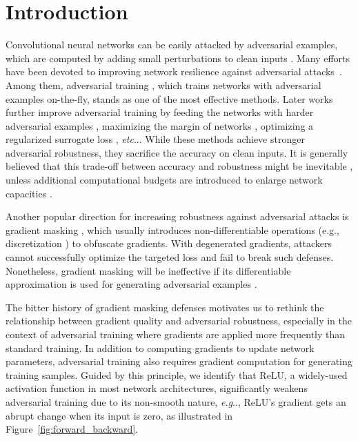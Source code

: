 \documentclass{article}
\makeatletter
\DeclareRobustCommand\onedot{\futurelet\@let@token\@onedot}
\def\@onedot{\ifx\@let@token.\else.\null\fi\xspace}
\def\eg{\emph{e.g}\onedot} \def\Eg{\emph{E.g}\onedot}
\def\etc{\emph{etc}\onedot} \def\vs{\emph{vs}\onedot}
\makeatother
\begin{document}
\section{Introduction}
Convolutional neural networks can be easily attacked by adversarial examples, which are computed by adding small perturbations to clean inputs \cite{Szegedy2014}. Many efforts have been devoted to improving network resilience against adversarial attacks~\cite{Guo2018,Papernot2016,Buckman2018,Xie2018,Madry2018,prakash2018,pang2019improving}. Among them, 
adversarial training \cite{Goodfellow2015,Kurakin2017,Madry2018}, which trains networks with adversarial examples on-the-fly, stands as one of the most effective methods.  Later works further improve adversarial training by feeding the networks with harder adversarial examples \cite{wang2019a}, maximizing the margin of networks \cite{ding2020}, optimizing a regularized surrogate loss \cite{Zhang2019a}, \etc. While these methods achieve stronger adversarial robustness, they sacrifice the accuracy on clean inputs. It is generally believed that this  trade-off between accuracy and robustness might be inevitable \cite{Tsipras2018}, unless additional computational budgets are introduced to enlarge network capacities \cite{Madry2018,xie2020intriguing}.

Another popular direction for increasing robustness against adversarial attacks is gradient masking \cite{papernot2017practical,Athalye2018}, which usually introduces non-differentiable operations (e.g., discretization \cite{Buckman2018,rozsa2019improved}) to obfuscate gradients. With degenerated gradients, attackers cannot successfully optimize the targeted loss and fail to break such defenses. Nonetheless, gradient masking will be ineffective if its differentiable approximation is used for generating adversarial examples \cite{Athalye2018}. 

The bitter history of gradient masking defenses motivates us to rethink the relationship between gradient quality and adversarial robustness, especially in the context of adversarial training where gradients are applied more frequently than standard training. In addition to computing gradients to update network parameters, adversarial training also requires gradient computation for generating training samples. Guided by this principle, we identify that ReLU, a widely-used activation function in most network architectures, significantly weakens adversarial training due to its non-smooth nature, \eg, ReLU's gradient gets an abrupt change when its input is zero, as illustrated in Figure~\ref{fig:forward_backward}.
\end{document}
